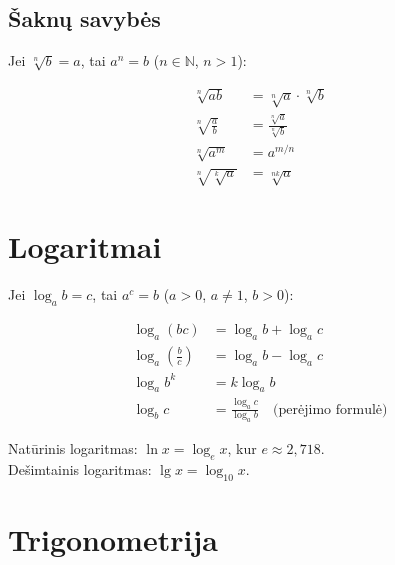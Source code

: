 \subsection{Šaknų savybės}

Jei $\sqrt[n]{b} = a$, tai $a^n = b$ \quad ($n \in \mathbb{N}$, $n > 1$):

\begin{align}
\sqrt[n]{ab}         &= \sqrt[n]{a}\cdot\sqrt[n]{b} \\[6pt]
\sqrt[n]{\frac{a}{b}} &= \frac{\sqrt[n]{a}}{\sqrt[n]{b}} \\[6pt]
\sqrt[n]{a^m}        &= a^{m/n} \\[6pt]
\sqrt[n]{\sqrt[k]{a}} &= \sqrt[nk]{a}
\end{align}

\section{Logaritmai}

Jei $\log_a b = c$, tai $a^c = b$ \quad ($a > 0$, $a \neq 1$, $b > 0$):

\begin{tcolorbox}[colback=green!5!white, colframe=green!60!black, title=Logaritmų savybės]
\begin{align}
\log_a(bc)  &= \log_a b + \log_a c \\[6pt]
\log_a\!\left(\frac{b}{c}\right) &= \log_a b - \log_a c \\[6pt]
\log_a b^k  &= k\log_a b \\[6pt]
\log_b c    &= \frac{\log_a c}{\log_a b} \quad \text{(perėjimo formulė)}
\end{align}
\end{tcolorbox}

\begin{remark}
Natūrinis logaritmas: $\ln x = \log_e x$, kur $e \approx 2{,}718$. \\
Dešimtainis logaritmas: $\lg x = \log_{10} x$.
\end{remark}

\section{Trigonometrija}

